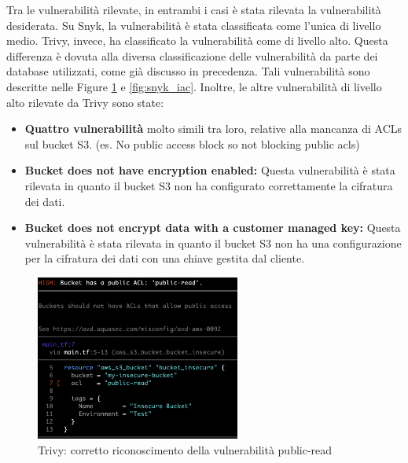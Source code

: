 Tra le vulnerabilità rilevate, in entrambi i casi è stata rilevata la vulnerabilità desiderata. Su Snyk, la vulnerabilità è stata classificata come l'unica di livello medio. Trivy, invece, ha classificato la vulnerabilità come di livello alto. Questa differenza è dovuta alla diversa classificazione delle vulnerabilità da parte dei database utilizzati, come già discusso in precedenza. Tali vulnerabilità sono descritte nelle Figure \ref{fig:trivy_iac} e \ref{fig:snyk_iac}.
Inoltre, le altre vulnerabilità di livello alto rilevate da Trivy sono state:
\begin{itemize}
   \item \textbf{Quattro vulnerabilità} molto simili tra loro, relative alla mancanza di ACLs sul bucket S3. (es. No public access block so not blocking public acls)
   \item \textbf{Bucket does not have encryption enabled:} Questa vulnerabilità è stata rilevata in quanto il bucket S3 non ha configurato correttamente la cifratura dei dati.
   \item \textbf{Bucket does not encrypt data with a customer managed key:} Questa vulnerabilità è stata rilevata in quanto il bucket S3 non ha una configurazione per la cifratura dei dati con una chiave gestita dal cliente.

\end{itemize}

\begin{figure}[H]
   \centering
   \includegraphics[width=0.6\textwidth]{immagini/capitolo2/trivy_iac.png}
   \caption{Trivy: corretto riconoscimento della vulnerabilità public-read}
   \label{fig:trivy_iac}
\end{figure}

